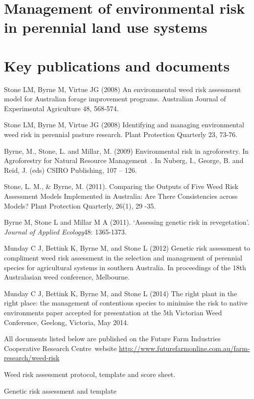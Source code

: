 \documentclass[version=last,
    paper=a4, %
    10pt, %
    usenames,
    dvipsnames,
    oneside, %
    headings=openany, %
    DIV=15 %
]{scrbook}
\begin{document}
\section*{Management of environmental risk in perennial land use systems
}


\section*{Key publications and documents}
Stone LM, Byrne M, Virtue JG (2008) An environmental weed risk
assessment model for Australian forage improvement programs. Australian
Journal of Experimental Agriculture 48, 568-574.

Stone LM, Byrne M, Virtue JG (2008) Identifying and managing
environmental weed risk in perennial pasture research. Plant Protection
Quarterly 23, 73-76.

Byrne, M., Stone, L. and Millar, M. (2009) Environmental risk in
agroforestry. In Agroforestry for Natural Resource Management~. In
Nuberg, I., George, B. and Reid, J. (eds) CSIRO Publishing, 107 -- 126.

Stone, L. M., \& Byrne, M. (2011). Comparing the Outputs of Five Weed
Risk Assessment Models Implemented in Australia: Are There Consistencies
across Models? Plant Protection Quarterly, 26(1), 29 -35.~

Byrne M, Stone L and Millar M A (2011). `Assessing genetic risk in
revegetation'. \emph{Journal of Applied Ecology}48: 1365-1373.

Munday C J, Bettink K, Byrne M, and Stone L (2012) Genetic risk
assessment to compliment weed risk assessment in the selection and
management of perennial species for agricultural systems in southern
Australia. In proceedings of the 18th Australasian weed conference,
Melbourne.~

Munday C J, Bettink K, Byrne M, and Stone L (2014) The right plant in
the right place: the management of contentious species to minimise the
risk to native environments paper accepted for presentation at the 5th
Victorian Weed Conference, Geelong, Victoria, May 2014.

All documents listed below are published on the Future Farm Industries
Cooperative Research Centre~website
\href{http://www.futurefarmonline.com.au/farm-research/weed-risk}{http://www.futurefarmonline.com.au/farm-research/weed-risk}

Weed risk assessment protocol, template and score sheet.

Genetic risk assessment and template
\end{document}
